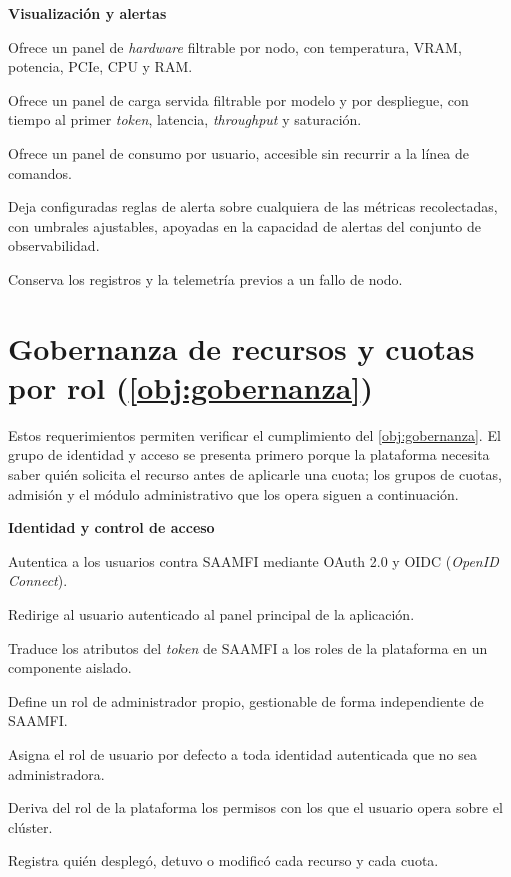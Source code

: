 \noindent\textbf{Visualización y alertas}
\begin{description}
\setlength{\itemsep}{4pt}
  \item[R1-27] Ofrece un panel de \emph{hardware} filtrable por nodo, con temperatura, VRAM, potencia, PCIe, CPU y RAM.
  \item[R1-28] Ofrece un panel de carga servida filtrable por modelo y por despliegue, con tiempo al primer \emph{token}, latencia, \emph{throughput} y saturación.
  \item[R1-29] Ofrece un panel de consumo por usuario, accesible sin recurrir a la línea de comandos.
  \item[R1-30] Deja configuradas reglas de alerta sobre cualquiera de las métricas recolectadas, con umbrales ajustables, apoyadas en la capacidad de alertas del conjunto de observabilidad.
  \item[R1-33] Conserva los registros y la telemetría previos a un fallo de nodo.
\end{description}

\section[Gobernanza de recursos y cuotas por rol (Objetivo 2)]{Gobernanza de recursos y cuotas por rol (\cref{obj:gobernanza})}
\label{sec:req-gobernanza}

Estos requerimientos permiten verificar el cumplimiento del \cref{obj:gobernanza}. El grupo de identidad y acceso se presenta primero porque la plataforma necesita saber quién solicita el recurso antes de aplicarle una cuota; los grupos de cuotas, admisión y el módulo administrativo que los opera siguen a continuación.

\noindent\textbf{Identidad y control de acceso}
\begin{description}
\setlength{\itemsep}{4pt}
  \item[R2-01] Autentica a los usuarios contra SAAMFI mediante OAuth 2.0 y OIDC (\emph{OpenID Connect}).
  \item[R2-02] Redirige al usuario autenticado al panel principal de la aplicación.
  \item[R2-03] Traduce los atributos del \emph{token} de SAAMFI a los roles de la plataforma en un componente aislado.
  \item[R2-04] Define un rol de administrador propio, gestionable de forma independiente de SAAMFI.
  \item[R2-05] Asigna el rol de usuario por defecto a toda identidad autenticada que no sea administradora.
  \item[R2-06] Deriva del rol de la plataforma los permisos con los que el usuario opera sobre el clúster.
  \item[R2-07] Registra quién desplegó, detuvo o modificó cada recurso y cada cuota.
\end{description}

